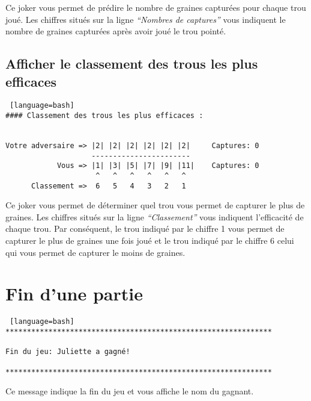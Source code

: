 \documentclass[11pt,a4paper]{report}
\begin{document}
            \begin{flushleft}
                Ce joker vous permet de prédire le nombre de graines capturées pour chaque trou joué. Les chiffres situés sur la ligne \textit{“Nombres de captures”} vous indiquent le nombre de graines capturées après avoir joué le trou pointé.
            \end{flushleft}

            \subsection{Afficher le classement des trous les plus efficaces}

\begin{lstlisting} [language=bash]
#### Classement des trous les plus efficaces :


Votre adversaire => |2| |2| |2| |2| |2| |2|     Captures: 0
                    -----------------------
            Vous => |1| |3| |5| |7| |9| |11|    Captures: 0
                     ^   ^   ^   ^   ^   ^
      Classement =>  6   5   4   3   2   1   
\end{lstlisting}

            \begin{flushleft}
                Ce joker vous permet de déterminer quel trou vous permet de capturer le plus de graines. Les chiffres situés sur la ligne \textit{“Classement”} vous indiquent l'efficacité de chaque trou. Par conséquent, le trou indiqué par le chiffre 1 vous permet de capturer le plus de graines une fois joué et le trou indiqué par le chiffre 6 celui qui vous permet de capturer le moins de graines.
            \end{flushleft}

        \section{Fin d'une partie}

\begin{lstlisting} [language=bash]
**************************************************************

Fin du jeu: Juliette a gagné!

**************************************************************
\end{lstlisting}

            \begin{flushleft}
                Ce message indique la fin du jeu et vous affiche le nom du gagnant.
            \end{flushleft}
        
\end{document}
